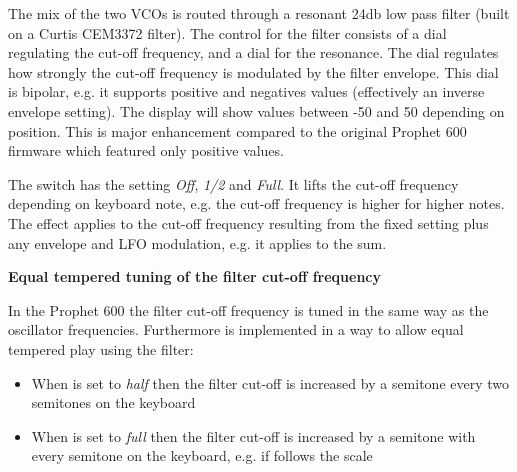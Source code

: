 The mix of the two VCOs is routed through a resonant 24db low pass filter (built on a Curtis CEM3372 filter). The control for the filter consists of a \filtercutoff dial regulating the cut-off frequency, and a \filterres dial for the resonance. The \filterenv dial regulates how strongly the cut-off frequency is modulated by the filter envelope. This dial is bipolar, e.g. it supports positive and negatives values (effectively an inverse envelope setting). The display will show values between -50 and 50 depending on position. This is major enhancement compared to the original Prophet 600 firmware which  featured only positive values.

\begin{center}
\end{center}

The \keyboardtrack switch has the setting \textit{Off}, \textit{1/2} and \textit{Full}. It lifts the cut-off frequency depending on keyboard note, e.g. the cut-off frequency is higher for higher notes. The effect applies to the cut-off frequency resulting from the fixed \filtercutoff setting plus any envelope and LFO modulation, e.g. it applies to the sum.  

\textbf{Equal tempered tuning of the filter cut-off frequency}

In the Prophet 600 the filter cut-off frequency is tuned in the same way as the oscillator frequencies. Furthermore \keyboardtrack is implemented in a way to allow equal tempered play using the filter:

\begin{itemize}
  \item When \keyboardtrack is set to \textit{half} then the filter cut-off is increased by a semitone every two semitones on the keyboard 
  \item When \keyboardtrack is set to \textit{full} then the filter cut-off is increased by a semitone with every semitone on the keyboard, e.g. if follows the scale 
\end{itemize}

